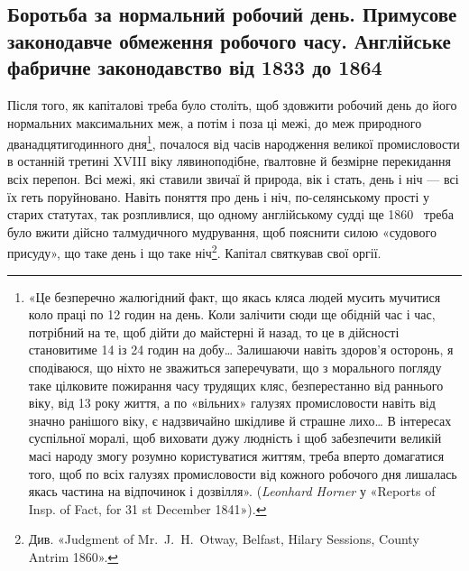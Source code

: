 
\subsection{Боротьба за нормальний робочий день. Примусове законодавче
обмеження робочого часу. Англійське фабричне законодавство
від 1833 до 1864~}

Після того, як капіталові треба було століть, щоб здовжити
робочий день до його нормальних максимальних меж, а потім і
поза ці межі, до меж природного дванадцятигодинного дня\footnote{
«Це безперечно жалюгідний факт, що якась кляса людей мусить
мучитися коло праці по 12 годин на день. Коли залічити сюди ще обідній
час і час, потрібний на те, щоб дійти до майстерні й назад, то це в дійсності
становитиме 14 із 24 годин на добу\dots{} Залишаючи навіть здоров’я осторонь,
я сподіваюся, що ніхто не зважиться заперечувати, що з морального
погляду таке цілковите пожирання часу трудящих кляс, безперестанно
від раннього віку, від 13 року життя, а по «вільних» галузях промисловости
навіть від значно ранішого віку, є надзвичайно шкідливе й страшне
лихо\dots{} В інтересах суспільної моралі, щоб виховати дужу людність
і щоб забезпечити великій масі народу змогу розумно користуватися
життям, треба вперто домагатися того, щоб по всіх галузях промисловости
від кожного робочого дня лишалась якась частина на відпочинок і дозвілля».
(\emph{Leonhard Horner} у «Reports of Insp. of Fact, for 31 st December
1841»).
},
почалося від часів народження великої промисловости в останній
третині XVIII віку лявиноподібне, ґвалтовне й безмірне перекидання
всіх перепон. Всі межі, які ставили звичаї й природа,
вік і стать, день і ніч — всі їх геть поруйновано. Навіть поняття
про день і ніч, по-селянському прості у старих статутах, так
розпливлися, що одному англійському судді ще 1860~ треба
було вжити дійсно талмудичного мудрування, щоб пояснити
силою «судового присуду», що таке день і що таке ніч\footnote{
Див. «Judgment of Mr.~J.~H.~Otway, Belfast, Hilary Sessions,
County Antrim 1860».
}. Капітал святкував свої оргії.

